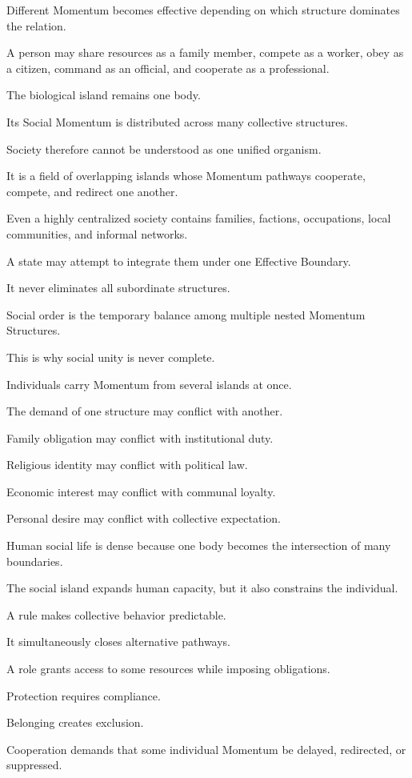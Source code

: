 Different Momentum becomes effective depending on which structure dominates the relation.

A person may share resources as a family member, compete as a worker, obey as a citizen, command as an official, and cooperate as a professional.

The biological island remains one body.

Its Social Momentum is distributed across many collective structures.

Society therefore cannot be understood as one unified organism.

It is a field of overlapping islands whose Momentum pathways cooperate, compete, and redirect one another.

Even a highly centralized society contains families, factions, occupations, local communities, and informal networks.

A state may attempt to integrate them under one Effective Boundary.

It never eliminates all subordinate structures.

Social order is the temporary balance among multiple nested Momentum Structures.

This is why social unity is never complete.

Individuals carry Momentum from several islands at once.

The demand of one structure may conflict with another.

Family obligation may conflict with institutional duty.

Religious identity may conflict with political law.

Economic interest may conflict with communal loyalty.

Personal desire may conflict with collective expectation.

Human social life is dense because one body becomes the intersection of many boundaries.

The social island expands human capacity, but it also constrains the individual.

A rule makes collective behavior predictable.

It simultaneously closes alternative pathways.

A role grants access to some resources while imposing obligations.

Protection requires compliance.

Belonging creates exclusion.

Cooperation demands that some individual Momentum be delayed, redirected, or suppressed.

